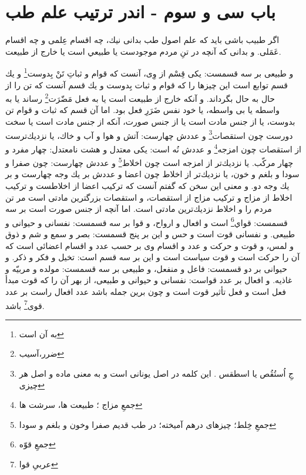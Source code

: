 \section*{باب سى و سوم - 
اندر ترتيب علم طب}

اگر طبيب باشى بايد كه علم اصول طب بدانى نيك، چه اقسام عِلمى و چه اقسام عَمَلى. و بدانى كه آنچه در تنِ مردم موجودست يا طبيعي‌ است يا خارج از طبيعت.

و طبيعى بر سه قسمست: يكى قِسْم از وِى، آنست كه قوام و ثباتِ تَنْ بِدوست\footnote{به آن است} و يك قسم توابع‌ است اين چيزها را كه قوام و ثبات بِدوست و يك قسم آنست كه تن را از حال به حال بگرداند. و آنكه خارج از طبيعت است يا به فعل مَضّرَت\footnote{ضرر،‌آسیب} رساند يا به واسطه يا بى واسطه، يا خود نفس ضَرَرِ فعل بود. اما آن قسم كه ثبات و قوام تن بدوست، يا از جنس مادت است يا از جنس صورت، آنكه از جنس مادت است يا سخت دورست چون استقصات\footnote{جِ اُستُقُص یا اسطقس . این کلمه در اصل یونانی است و به معنی ماده و اصل هر چیزی} و عددش چهارست: آتش و هوا و آب و خاك، يا نزديك‌ترست از استقصات چون امزجه\footnote{جمعِ مزاج ؛ طبیعت ها، سرشت ها} و عددش نُه است: يكى معتدل و هشت نامعتدل: چهار مفرد و چهار مركّب. يا نزديك‌تر از امزجه است چون اخلاط\footnote{جمعِ خِلط؛ چیزهای درهم آمیخته؛ در طب قدیم صفرا وخون و بلغم و سودا} و عددش چهارست: چون صفرا و سودا و بلغم و خون، يا نزديك‌تر از اخلاط چون اعضا و عددش بر يك وجه چهارست و بر يك وجه دو. و معنى اين سخن كه گفتم آنست كه تركيب اعضا از اخلاطست و تركيب اخلاط از مزاج و تركيب مزاج از استقصات، و استقصات بزرگترين مادتى است مر تن مردم را و اخلاط نزديك‌ترين مادتى است. اما آنچه از جنس صورت است بر سه قسمست: قواي‌\footnote{جمعِ قوّه} است و افعال و ارواح، و قوا بر سه قسمست: نفسانى و حيوانى و طبيعى. و نفسانى قوت ‌است و حس و اين بر پنج قسمست: بصر و سمع و شم و ذوق و لمس، و قوت و حركت و عدد و اقسام وى بر حسب عدد و اقسام اعضائى است كه آن را حركت است و قوت سياست است و اين بر سه قسم است: تخيل و فكر و ذكر. و حيوانى بر دو قسمست: فاعل و منفعل، و طبيعى بر سه قسمست: مولده و مربيّه و غاذيه. و افعال بر عدد قواست: نفسانى و حيوانى و طبيعى، از بهر آن را كه قوت مبدأ فعل است و فعل تأثير قوت است و چون برين جمله باشد عدد افعال راست بر عدد قوى\footnote{عربیِ قوا} باشد.

